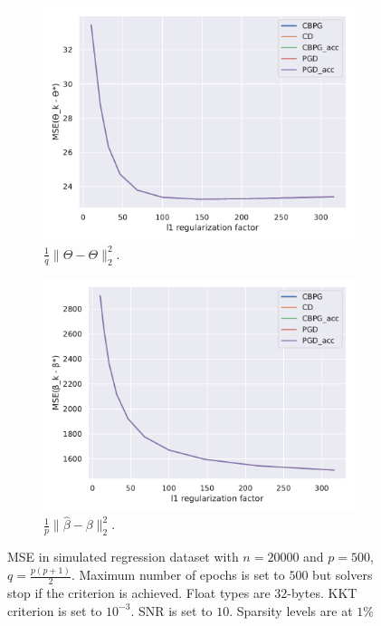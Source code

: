 \documentclass[a4]{article}
\begin{document}
\begin{figure}[ht!]
	\begin{subfigure}{.45\textwidth}
		\centering
		\includegraphics[scale = 0.43]{prebuilt_images/simu_total/simulated_n20000p500_snr=10_difftheta_2605.pdf}
		\caption{$\frac{1}{q}\|\widehat \Theta - \Theta\|^2_2$.}
		\label{fig:mse_theta}
	\end{subfigure}
	\begin{subfigure}{.45\textwidth}
		\centering
		\includegraphics[scale = 0.43]{prebuilt_images/simu_total/simulated_n20000p500_snr=10_diffbeta_2605.pdf}
		\caption{$\frac{1}{p}\|\widehat \beta - \beta\|^2_2$.}
		\label{fig:mse_beta}
	\end{subfigure}
	\caption{MSE in simulated regression dataset with $n=20000$ and $p=500$, $q=\frac{p(p+1)}{2}$.
	Maximum number of epochs is set to $500$ but solvers stop if the criterion is achieved. Float types are $32$-bytes. KKT criterion is set to $10^{-3}$. SNR is set to $10$. Sparsity levels are at $1\%$}
	\label{fig:mse_coeffs}
\end{figure}
\end{document}
